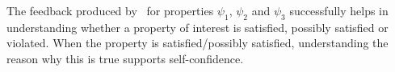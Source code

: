 The feedback produced by \NAME\ for properties $\psi_1$, $\psi_2$ and $\psi_3$ successfully helps in understanding whether a property of interest is satisfied, possibly satisfied or violated. 
When the property is satisfied/possibly satisfied, understanding the reason why this is true supports self-confidence.






